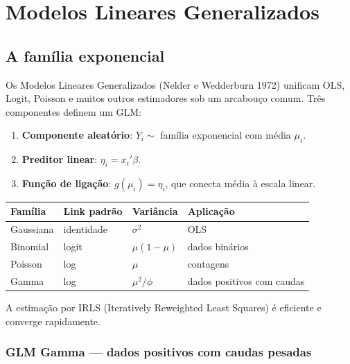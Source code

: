 \chapter{Modelos Lineares Generalizados}
\label{cap:glm}

\section{A família exponencial}

Os Modelos Lineares Generalizados (Nelder e Wedderburn 1972) unificam OLS,
Logit, Poisson e muitos outros estimadores sob um arcabouço comum. Três
componentes definem um GLM:

\begin{enumerate}
  \item \textbf{Componente aleatório}: $Y_i \sim$ família exponencial com
  média $\mu_i$.
  \item \textbf{Preditor linear}: $\eta_i = x_i'\beta$.
  \item \textbf{Função de ligação}: $g(\mu_i) = \eta_i$, que conecta média
  à escala linear.
\end{enumerate}

\begin{center}
\begin{tabular}{llll}
\toprule
\textbf{Família} & \textbf{Link padrão} & \textbf{Variância} & \textbf{Aplicação} \\
\midrule
Gaussiana   & identidade & $\sigma^2$   & OLS \\
Binomial    & logit      & $\mu(1-\mu)$ & dados binários \\
Poisson     & log        & $\mu$        & contagens \\
Gamma       & log        & $\mu^2/\phi$ & dados positivos com caudas \\
\bottomrule
\end{tabular}
\end{center}

A estimação por IRLS (Iteratively Reweighted Least Squares) é eficiente e
converge rapidamente.

\subsection*{GLM Gamma — dados positivos com caudas pesadas}

